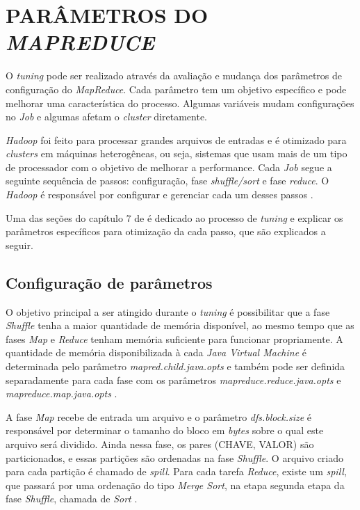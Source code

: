 \section{PARÂMETROS DO \textit{MAPREDUCE}} \label{sec:parametrosmapreduce}

O \textit{tuning} pode ser realizado através da avaliação e mudança dos parâmetros de configuração do \textit{MapReduce}. Cada parâmetro tem um objetivo específico e pode melhorar uma característica do processo. Algumas variáveis mudam configurações no \textit{Job} e algumas afetam o \textit{cluster} diretamente.

\textit{Hadoop} foi feito para processar grandes arquivos de entradas e é otimizado para \textit{clusters} em máquinas heterogêneas, ou seja, sistemas que usam mais de um tipo de processador com o objetivo de melhorar a performance. Cada \textit{Job} segue a seguinte sequência de passos: configuração, fase \textit{shuffle/sort} e fase \textit{reduce}. O \textit{Hadoop} é responsável por configurar e gerenciar cada um desses passos \cite{ProHadoop09}.

Uma das seções do capítulo 7 de \textcite{HadoopBook15} é dedicado ao processo de \textit{tuning} e explicar os parâmetros específicos para otimização da cada passo, que são explicados a seguir.

\subsection{Configuração de parâmetros}\label{ssec:configuracaooparametros}

O objetivo principal a ser atingido durante o \textit{tuning} é possibilitar que a fase \textit{Shuffle} tenha a maior quantidade de memória disponível, ao mesmo tempo que as fases \textit{Map} e \textit{Reduce} tenham memória suficiente para funcionar propriamente. A quantidade de memória disponibilizada à cada \textit{Java Virtual Machine} é determinada pelo parâmetro \textit{mapred.child.java.opts} e também pode ser definida separadamente para cada fase com os parâmetros \textit{mapreduce.reduce.java.opts} e \textit{mapreduce.map.java.opts} \cite{HadoopBook15}.

A fase \textit{Map} recebe de entrada um arquivo e o parâmetro \textit{dfs.block.size} é responsável por determinar o tamanho do bloco em \textit{bytes} sobre o qual este arquivo será dividido. Ainda nessa fase, os pares (CHAVE, VALOR) são particionados, e essas partições são ordenadas na fase \textit{Shuffle}. O arquivo criado para cada partição é chamado de \textit{spill}. Para cada tarefa \textit{Reduce}, existe um \textit{spill}, que passará por uma ordenação do tipo \textit{Merge Sort}, na etapa segunda etapa da fase \textit{Shuffle}, chamada de \textit{Sort} \cite{ProHadoop09}.

